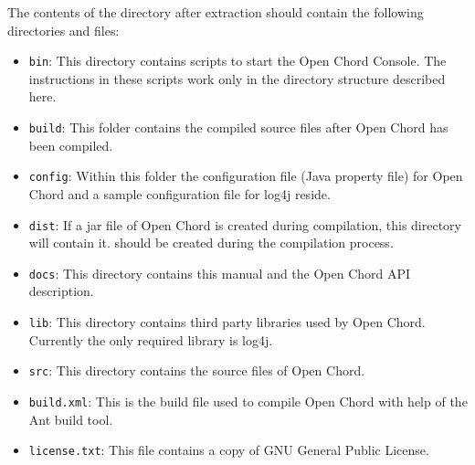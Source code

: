 The contents of the directory after extraction should contain the following 
directories and files: 
\vspace{-0.5cm}
\begin{itemize}
\item {\tt bin}: This directory contains scripts to start the Open Chord Console. The instructions in these scripts work only in the directory structure described here. 
\item {\tt build}: This folder contains the compiled source files after Open Chord 
has been compiled. 
\item {\tt config}: Within this folder the configuration file (Java property file) for Open Chord and a sample configuration file for log4j reside. 
\item {\tt dist}: If a jar file of Open Chord is created during compilation, this directory will contain it. 
should be created during the compilation process. 
\item {\tt docs}: This directory contains this manual and the Open Chord API description. 
\item {\tt lib}: This directory contains third party libraries used by Open Chord. 
Currently the only required library is log4j. 
\item {\tt src}: This directory contains the source files of Open Chord. 
\item {\tt build.xml}: This is the build file used to compile Open Chord with help 
of the Ant build tool. 
\item {\tt license.txt}: This file contains a copy of GNU General Public License. 
\end{itemize}
\vspace{-0.5cm}

